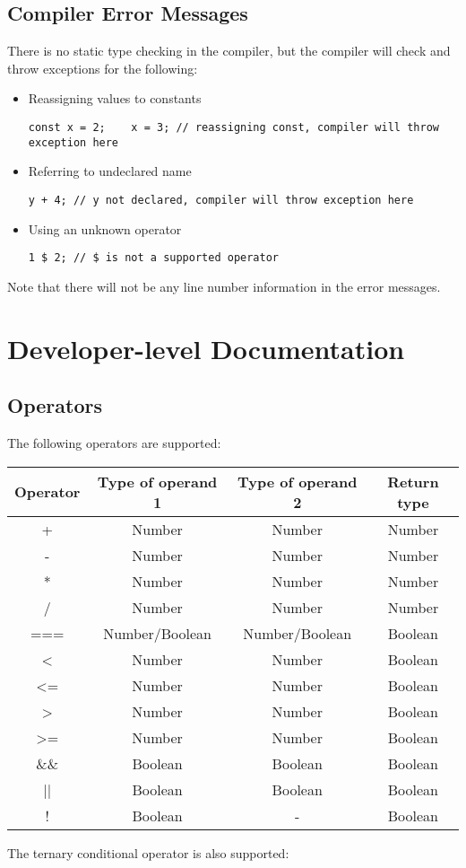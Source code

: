 \subsection{Compiler Error Messages}
There is no static type checking in the compiler, but the compiler will check and throw exceptions for the following: 
\begin{itemize}
\item Reassigning values to constants
\begin{verbatim}
const x = 2;    x = 3; // reassigning const, compiler will throw exception here
\end{verbatim}
\item Referring to undeclared name
\begin{verbatim}
y + 4; // y not declared, compiler will throw exception here
\end{verbatim}
\item Using an unknown operator
\begin{verbatim}
1 $ 2; // $ is not a supported operator
\end{verbatim}

\end{itemize}
Note that there will not be any line number information in the error messages.
\pagebreak
\section{Developer-level Documentation}
\subsection{Operators}
The following operators are supported: 
\begin{center}
  \begin{tabular}{|c | c | c | c|} 
   \hline
   Operator & Type of operand 1 & Type of operand 2 & Return type \\ 
   \hline\hline
   + & Number & Number & Number \\ 
   \hline
   - & Number & Number & Number \\ 
   \hline
   * & Number & Number & Number \\ 
   \hline
   / & Number & Number & Number \\ 
   \hline
   === & Number/Boolean & Number/Boolean & Boolean \\ 
   \hline
   < & Number & Number & Boolean \\ 
   \hline
   <= & Number & Number & Boolean \\ 
   \hline
   > & Number & Number & Boolean \\ 
   \hline
   >= & Number & Number & Boolean \\ 
   \hline
   \&\& & Boolean & Boolean & Boolean \\ 
   \hline
   || & Boolean & Boolean & Boolean \\ 
   \hline
   ! & Boolean & - & Boolean \\ 
   \hline
  \end{tabular}
\end{center}
The ternary conditional operator is also supported: \\

